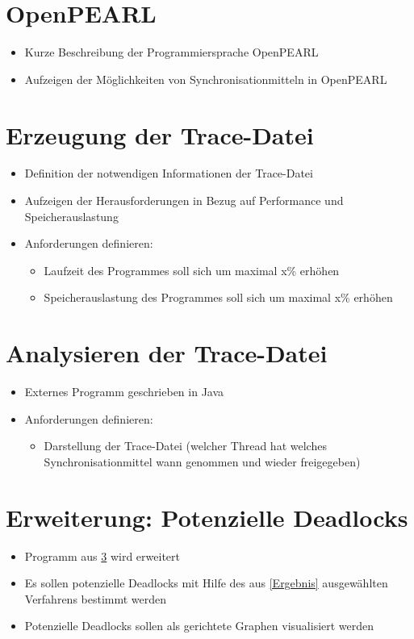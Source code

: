 \section{OpenPEARL}
\begin{itemize}
    \item Kurze Beschreibung der Programmiersprache OpenPEARL
    \item Aufzeigen der Möglichkeiten von Synchronisationmitteln in OpenPEARL
\end{itemize}

\section{Erzeugung der Trace-Datei}
\begin{itemize}
    \item Definition der notwendigen Informationen der Trace-Datei
    \item Aufzeigen der Herausforderungen in Bezug auf Performance und
    Speicherauslastung
  \item Anforderungen definieren:
  \begin{itemize}
    \item Laufzeit des Programmes soll sich um maximal x\% erhöhen
    \item Speicherauslastung des Programmes soll sich um maximal x\% erhöhen
  \end{itemize}
\end{itemize}

\section{Analysieren der Trace-Datei}\label{Analysieren der Trace-Datei}
\begin{itemize}
  \item Externes Programm geschrieben in Java
  \item Anforderungen definieren:
  \begin{itemize}
    \item Darstellung der Trace-Datei (welcher Thread hat welches
    Synchronisationmittel wann genommen und wieder freigegeben) 
  \end{itemize}
\end{itemize}

\section{Erweiterung: Potenzielle Deadlocks}
\begin{itemize}
  \item Programm aus \ref{Analysieren der Trace-Datei} wird erweitert
  \item Es sollen potenzielle Deadlocks mit Hilfe des aus \ref{Ergebnis}
  ausgewählten Verfahrens bestimmt werden
  \item Potenzielle Deadlocks sollen als gerichtete Graphen visualisiert werden
\end{itemize}